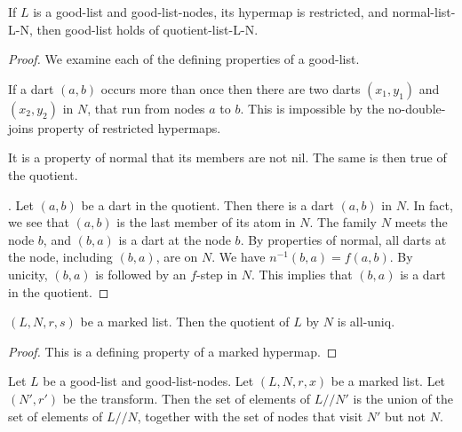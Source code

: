 \begin{lemma}
If $L$ is a good-list and good-list-nodes, its hypermap is restricted,
and normal-list-L-N, then good-list holds of quotient-list-L-N.
\end{lemma}

\begin{proof} We examine each of the defining properties of a good-list.  

If a dart $(a,b)$ occurs more than once  then there are two darts $(x_1,y_1)$ and $(x_2,y_2)$ in $N$, that run from
nodes $a$ to $b$.  This is impossible by the no-double-joins property of restricted hypermaps.

  It is a property of normal that its members are not nil.  The same is then true of the quotient.

.  Let $(a,b)$ be a dart in the quotient.  Then there is a dart $(a,b)$ in $N$.  In fact, we see that $(a,b)$ is the last member of
its atom in $N$.  The family $N$ meets the node $b$,
and $(b,a)$ is a dart at the node $b$.  By properties of normal, all darts at the node, including $(b,a)$, are on $N$.
We have $n^{-1}(b,a) = f (a,b)$.  By unicity, $(b,a)$ is followed by an $f$-step in $N$.  This implies that $(b,a)$ is a dart in the
quotient. 
\end{proof}

\begin{lemma}
$(L,N,r,s)$ be a marked list.  Then the quotient of $L$ by $N$ is all-uniq.
\end{lemma}

\begin{proof}  This is a defining property of a marked hypermap.
\end{proof}

\begin{lemma}
Let $L$ be a good-list and good-list-nodes.
Let $(L,N,r,x)$ be a marked list.  Let $(N',r')$ be the transform.  Then the set of elements of $L//N'$
is the union of the set of elements of $L//N$, together with the set of nodes that visit $N'$ but not $N$.
\end{lemma}

